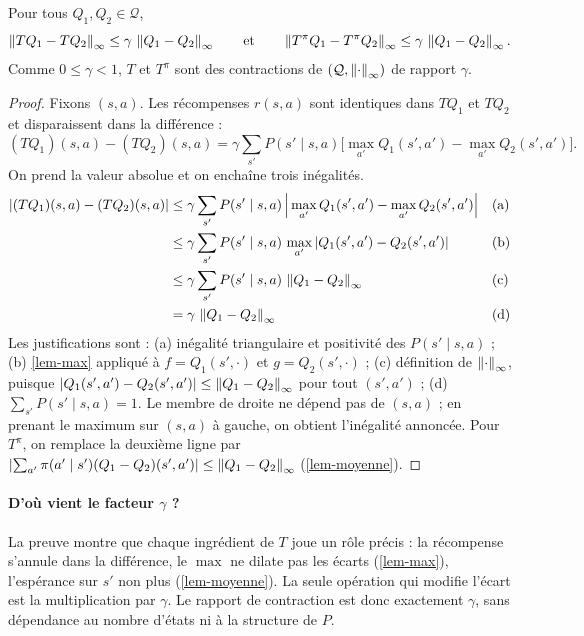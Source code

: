 \begin{theoreme}\label{thm-contraction}
Pour tous $Q_1,Q_2\in\mathcal Q$,
\[
\left\lVert TQ_1-TQ_2 \right\rVert_\infty\le\gamma\,\left\lVert Q_1-Q_2 \right\rVert_\infty\qquad\text{et}\qquad\left\lVert T^\pi Q_1-T^\pi Q_2 \right\rVert_\infty\le\gamma\,\left\lVert Q_1-Q_2 \right\rVert_\infty.
\]
Comme $0\le\gamma<1$, $T$ et $T^\pi$ sont des contractions de $(\mathcal Q,\left\lVert \cdot \right\rVert_\infty)$ de rapport $\gamma$.
\end{theoreme}
\begin{proof}
Fixons $(s,a)$. Les récompenses $r(s,a)$ sont identiques dans $TQ_1$ et $TQ_2$ et disparaissent dans la différence :
\[
(TQ_1)(s,a)-(TQ_2)(s,a)=\gamma\sum_{s'}P(s'\mid s,a)\Big[\max_{a'}Q_1(s',a')-\max_{a'}Q_2(s',a')\Big].
\]
On prend la valeur absolue et on enchaîne trois inégalités.
\begin{align*}
\left\lvert (TQ_1)(s,a)-(TQ_2)(s,a) \right\rvert
&\le\gamma\sum_{s'}P(s'\mid s,a)\,\Big|\max_{a'}Q_1(s',a')-\max_{a'}Q_2(s',a')\Big| &&\text{(a)}\\
&\le\gamma\sum_{s'}P(s'\mid s,a)\,\max_{a'}\left\lvert Q_1(s',a')-Q_2(s',a') \right\rvert &&\text{(b)}\\
&\le\gamma\sum_{s'}P(s'\mid s,a)\,\left\lVert Q_1-Q_2 \right\rVert_\infty &&\text{(c)}\\
&=\gamma\,\left\lVert Q_1-Q_2 \right\rVert_\infty &&\text{(d)}
\end{align*}
Les justifications sont : (a) inégalité triangulaire et positivité des $P(s'\mid s,a)$ ; (b) \cref{lem-max} appliqué à $f=Q_1(s',\cdot)$ et $g=Q_2(s',\cdot)$ ; (c) définition de $\left\lVert \cdot \right\rVert_\infty$, puisque $\left\lvert Q_1(s',a')-Q_2(s',a') \right\rvert\le\left\lVert Q_1-Q_2 \right\rVert_\infty$ pour tout $(s',a')$ ; (d) $\sum_{s'}P(s'\mid s,a)=1$. Le membre de droite ne dépend pas de $(s,a)$ ; en prenant le maximum sur $(s,a)$ à gauche, on obtient l'inégalité annoncée. Pour $T^\pi$, on remplace la deuxième ligne par $\left\lvert \sum_{a'}\pi(a'\mid s')(Q_1-Q_2)(s',a') \right\rvert\le\left\lVert Q_1-Q_2 \right\rVert_\infty$ (\cref{lem-moyenne}).
\end{proof}

\paragraph{D'où vient le facteur $\gamma$ ?} La preuve montre que chaque ingrédient de $T$ joue un rôle précis : la récompense s'annule dans la différence, le $\max$ ne dilate pas les écarts (\cref{lem-max}), l'espérance sur $s'$ non plus (\cref{lem-moyenne}). La seule opération qui modifie l'écart est la multiplication par $\gamma$. Le rapport de contraction est donc exactement $\gamma$, sans dépendance au nombre d'états ni à la structure de $P$.

